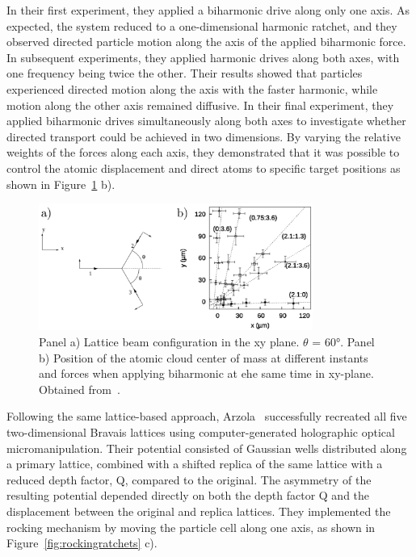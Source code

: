  In their first experiment, they applied a biharmonic drive along only one axis. As expected, the system reduced to a one-dimensional harmonic ratchet, and they observed directed particle motion along the axis of the applied biharmonic force. In subsequent experiments, they applied harmonic drives along both axes, with one frequency being twice the other. Their results showed that particles experienced directed motion along the axis with the faster harmonic, while motion along the other axis remained diffusive. In their final experiment, they applied biharmonic drives simultaneously along both axes to investigate whether directed transport could be achieved in two dimensions. By varying the relative weights of the forces along each axis, they demonstrated that it was possible to control the atomic displacement and direct atoms to specific target positions as shown in Figure~\ref{fig:lebedevexperiment} b).


 \begin{figure}[h]
  \begin{center}
    \includegraphics[width=0.80\textwidth]{figures/LebedevExperiment.png}
  \end{center}
  \caption[Lebedev experiment.]{Panel a) Lattice beam configuration in the xy plane. $\theta$ = 60°. Panel b) Position of the atomic cloud center of mass at different instants and forces when applying biharmonic at ehe same time in xy-plane. Obtained from~\cite{lebedev2009two}.}\label{fig:lebedevexperiment}
 \end{figure}

 Following the same lattice-based approach, Arzola~\cite{arzola2017omnidirectional} successfully recreated all five two-dimensional Bravais lattices using computer-generated holographic optical micromanipulation. Their potential consisted of Gaussian wells distributed along a primary lattice, combined with a shifted replica of the same lattice with a reduced depth factor, Q, compared to the original. The asymmetry of the resulting potential depended directly on both the depth factor Q and the displacement between the original and replica lattices. They implemented the rocking mechanism by moving the particle cell along one axis, as shown in Figure~\ref{fig:rockingratchets} c).

